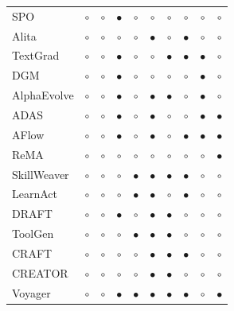 \documentclass[10pt]{article} %
\begin{document}
\begin{table}[!t]
{\begin{tabular}{@{}l cc cc ccc cc@{}}
SPO\citep{xiang2025self} & \(\circ\) & \(\circ\) & \(\bullet\) & \(\circ\) &
\(\circ\) & \(\circ\) & \(\circ\) & \(\circ\) & \(\circ\) \\
Alita\citep{qiu2025alita} & \(\circ\) & \(\circ\) & \(\circ\) & \(\circ\) &
\(\bullet\) & \(\circ\) & \(\bullet\) & \(\circ\) & \(\circ\) \\
TextGrad\citep{yellamraju2024textgrad} & \(\circ\) & \(\circ\) & \(\bullet\) & \(\circ\) &
\(\circ\) & \(\bullet\) & \(\bullet\) & \(\bullet\) & \(\circ\) \\
DGM\citep{zhang2025darwin} & \(\circ\) & \(\circ\) & \(\bullet\) & \(\circ\) &
\(\circ\) & \(\circ\) & \(\circ\) & \(\bullet\) & \(\circ\) \\
AlphaEvolve\citep{novikov2025alphaevolve} & \(\circ\) & \(\circ\) & \(\bullet\)  & \(\circ\) &
\(\bullet\)  & \(\bullet\)  & \(\circ\) & \(\bullet\) & \(\circ\) \\
ADAS\citep{hu2024automated} & \(\circ\) & \(\circ\) & \(\bullet\)& \(\circ\) &
\(\bullet\) & \(\circ\) & \(\circ\) & \(\bullet\) & \(\bullet\) \\
AFlow\citep{zhang2024aflow} & \(\circ\) & \(\circ\) & \(\bullet\)& \(\circ\) &
\(\bullet\) & \(\circ\) & \(\bullet\) & \(\bullet\) & \(\bullet\) \\
ReMA\citep{wan2025remalearningmetathinkllms} & \(\circ\) & \(\circ\) & \(\circ\) & \(\circ\) &
\(\circ\) & \(\circ\) & \(\circ\) & \(\circ\) & \(\bullet\) \\
SkillWeaver\citep{zheng2025skillweaver} & \(\circ\) & \(\circ\) & \(\circ\) & \(\bullet\) &
\(\bullet\) & \(\bullet\) & \(\bullet\) & \(\circ\) & \(\circ\) \\
LearnAct\citep{zhao2024learnact} & \(\circ\) & \(\circ\) & \(\circ\) & \(\bullet\) &
\(\bullet\) & \(\circ\) & \(\bullet\) & \(\circ\) & \(\circ\) \\
DRAFT\citep{fromexplorationtomastery} & \(\circ\) & \(\circ\) & \(\bullet\) & \(\circ\) &
\(\bullet\) & \(\bullet\) & \(\circ\) & \(\circ\) & \(\circ\) \\
ToolGen\citep{wang2025toolgen} & \(\circ\) & \(\circ\) & \(\circ\) & \(\bullet\) &
\(\bullet\)& \(\bullet\) & \(\circ\) & \(\circ\) & \(\circ\) \\
CRAFT\citep{yuan2024craft} & \(\circ\) & \(\circ\) & \(\circ\) & \(\circ\) &
\(\bullet\) & \(\bullet\) & \(\bullet\) & \(\circ\) & \(\circ\) \\
CREATOR\citep{qian2023creator} & \(\circ\) & \(\circ\) & \(\circ\) & \(\circ\) &
\(\bullet\) & \(\bullet\) & \(\circ\) & \(\circ\) & \(\circ\) \\
Voyager\citep{wang2023voyager} & \(\circ\) & \(\circ\) & \(\bullet\) & \(\bullet\) &
\(\bullet\) & \(\bullet\) & \(\bullet\) & \(\circ\) & \(\bullet\) \\
\bottomrule
\end{tabular}}
\end{table}
\end{document}
